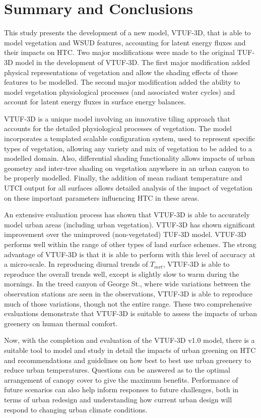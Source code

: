 \documentclass[final,3p,times,authoryear]{elsarticle}
\begin{document}
\section{Summary and Conclusions}

This study presents the development of a new model, VTUF-3D, that is able to model vegetation and WSUD features, accounting for latent energy fluxes and their impacts on HTC. Two major modifications were made to the original TUF-3D model in the development of VTUF-3D. The first major modification added physical representations of vegetation and allow the shading effects of those features to be modelled. The second major modification added the ability to model vegetation physiological processes (and associated water cycles) and account for latent energy fluxes in surface energy balances.

VTUF-3D is a unique model involving an innovative tiling approach that accounts for the detailed physiological processes of vegetation. The model incorporates a templated scalable configuration system, used to represent specific types of vegetation, allowing any variety and mix of vegetation to be added to a modelled domain. Also, differential shading functionality allows impacts of urban geometry and inter-tree shading on vegetation anywhere in an urban canyon to be properly modelled. Finally, the addition of mean radiant temperature and UTCI output for all surfaces allows detailed analysis of the impact of vegetation on these important parameters influencing HTC in these areas.

An extensive evaluation process has shown that VTUF-3D is able to accurately model urban areas (including urban vegetation). VTUF-3D has shown significant improvement over the unimproved (non-vegetated) TUF-3D model. VTUF-3D performs well within the range of other types of land surface schemes. The strong advantage of VTUF-3D is that it is able to perform with this level of accuracy at a micro-scale. In reproducing diurnal trends of $T_{mrt}$, VTUF-3D is able to reproduce the overall trends well, except is slightly slow to warm during the mornings. In the treed canyon of George St., where wide variations between the observation stations are seen in the observations, VTUF-3D is able to reproduce much of those variations, though not the entire range. These two comprehensive evaluations demonstrate that VTUF-3D is suitable to assess the impacts of urban greenery on human thermal comfort.

Now, with the completion and evaluation of the VTUF-3D v1.0 model, there is a suitable tool to
model and study in detail the impacts of urban greening on HTC and recommendations and guidelines on how best to
best use urban greenery to reduce urban temperatures. Questions can be answered as to the optimal arrangement of
canopy cover to give the maximum benefits. Performance of future scenarios can also help inform responses to future
challenges, both in terms of urban redesign and understanding how current urban design will respond to changing
urban climate conditions.
\end{document}

